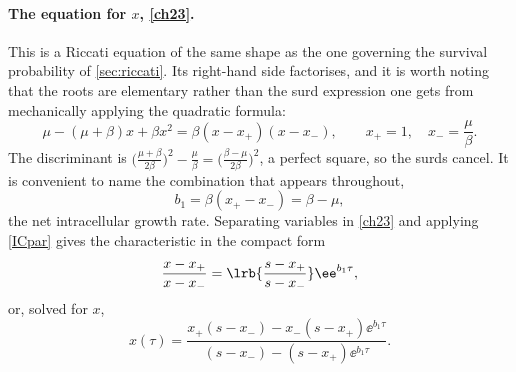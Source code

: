 \paragraph{The equation for $x$, \eqref{ch23}.}
This is a Riccati equation of the same shape as the one governing the survival
probability of \cref{sec:riccati}. Its right-hand side factorises, and it is worth
noting that the roots are elementary rather than the surd expression one gets from
mechanically applying the quadratic formula:
\begin{equation}
\label{eq:xpm}
\mu - (\mu+\beta)x + \beta x^2 = \beta(x-x_+)(x-x_-),
\qquad
x_+ = 1,\quad x_- = \frac{\mu}{\beta}.
\end{equation}
The discriminant is $\bigl(\tfrac{\mu+\beta}{2\beta}\bigr)^2 - \tfrac{\mu}{\beta}
= \bigl(\tfrac{\beta-\mu}{2\beta}\bigr)^2$, a perfect square, so the surds cancel. It
is convenient to name the combination that appears throughout,
\begin{equation}
\label{eq:b1}
b_1 = \beta(x_+ - x_-) = \beta-\mu ,
\end{equation}
the net intracellular growth rate. Separating variables in \cref{ch23} and applying
\cref{ICpar} gives the characteristic in the compact form
\begin{equation}
\label{eq:xratio}
\frac{x-x_+}{x-x_-} = \lrb{\frac{s-x_+}{s-x_-}}\ee^{b_1\tau},
\end{equation}
or, solved for $x$,
\begin{equation}
\label{xabd}
x(\tau) = \frac{x_+(s-x_-) - x_-(s-x_+)\ee^{b_1\tau}}{(s-x_-) - (s-x_+)\ee^{b_1\tau}} .
\end{equation}

